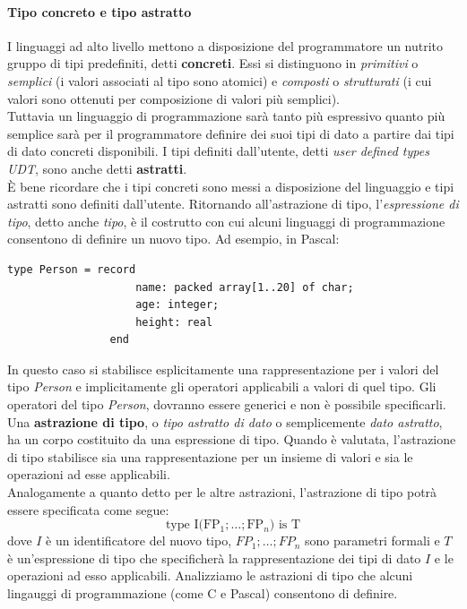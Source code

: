 \documentclass[12pt]{report}
\begin{document}
			\paragraph{Tipo concreto e tipo astratto} I linguaggi ad alto livello mettono a disposizione del programmatore un nutrito gruppo di tipi predefiniti, detti \textbf{concreti}. Essi si distinguono in \textit{primitivi} o \textit{semplici} (i valori associati al tipo sono atomici) e \textit{composti} o \textit{strutturati} (i cui valori sono ottenuti per composizione di valori più semplici). \\
			Tuttavia un linguaggio di programmazione sarà tanto più espressivo quanto più semplice sarà per il programmatore definire dei suoi tipi di dato a partire dai tipi di dato concreti disponibili. I tipi definiti dall'utente, detti \textit{user defined types UDT}, sono anche detti \textbf{astratti}. \\
			È bene ricordare che i tipi concreti sono messi a disposizione del linguaggio e tipi astratti sono definiti dall'utente.
			Ritornando all'astrazione di tipo, l'\textit{espressione di tipo}, detto anche \textit{tipo}, è il costrutto con cui alcuni linguaggi di programmazione consentono di definire un nuovo tipo. Ad esempio, in Pascal:
			\begin{lstlisting}[style=pascalstyle]
				type Person = record
					name: packed array[1..20] of char;
					age: integer;
					height: real
				end\end{lstlisting}
			In questo caso si stabilisce esplicitamente una rappresentazione per i valori del tipo \textit{Person} e implicitamente gli operatori applicabili a valori di quel tipo. Gli operatori del tipo \textit{Person}, dovranno essere generici e non è possibile specificarli. \\
			Una \textbf{astrazione di tipo}, o \textit{tipo astratto di dato} o semplicemente \textit{dato astratto}, ha un corpo costituito da una espressione di tipo. Quando è valutata, l'astrazione di tipo stabilisce sia una rappresentazione per un insieme di valori e sia le operazioni ad esse applicabili. \\
			Analogamente a quanto detto per le altre astrazioni, l'astrazione di tipo potrà essere specificata come segue:
			\[
			\text{type I(FP$_1;\dots;$FP$_n$) is T}
			\]
			dove $I$ è un identificatore del nuovo tipo,  $FP_1;\dots;FP_n$ sono parametri formali e  $T$ è un'espressione di tipo che specificherà la rappresentazione dei tipi di dato $I$ e le operazioni ad esso applicabili. Analizziamo le astrazioni di tipo che alcuni lingauggi di programmazione (come C e Pascal) consentono di definire.
\end{document}
